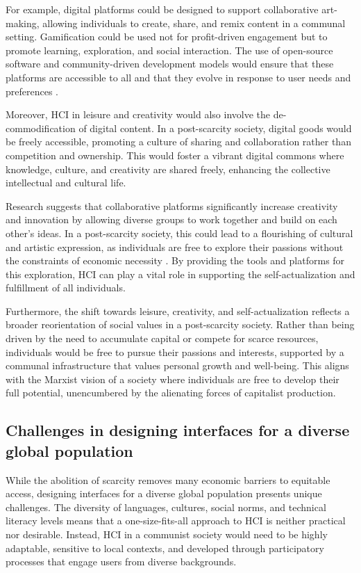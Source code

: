 For example, digital platforms could be designed to support collaborative art-making, allowing individuals to create, share, and remix content in a communal setting. Gamification could be used not for profit-driven engagement but to promote learning, exploration, and social interaction. The use of open-source software and community-driven development models would ensure that these platforms are accessible to all and that they evolve in response to user needs and preferences \cite[pp.~67-69]{debord1967}.

Moreover, HCI in leisure and creativity would also involve the de-commodification of digital content. In a post-scarcity society, digital goods would be freely accessible, promoting a culture of sharing and collaboration rather than competition and ownership. This would foster a vibrant digital commons where knowledge, culture, and creativity are shared freely, enhancing the collective intellectual and cultural life.

Research suggests that collaborative platforms significantly increase creativity and innovation by allowing diverse groups to work together and build on each other's ideas. In a post-scarcity society, this could lead to a flourishing of cultural and artistic expression, as individuals are free to explore their passions without the constraints of economic necessity \cite[pp.~158-160]{freire2005}. By providing the tools and platforms for this exploration, HCI can play a vital role in supporting the self-actualization and fulfillment of all individuals.

Furthermore, the shift towards leisure, creativity, and self-actualization reflects a broader reorientation of social values in a post-scarcity society. Rather than being driven by the need to accumulate capital or compete for scarce resources, individuals would be free to pursue their passions and interests, supported by a communal infrastructure that values personal growth and well-being. This aligns with the Marxist vision of a society where individuals are free to develop their full potential, unencumbered by the alienating forces of capitalist production.

\subsection{Challenges in designing interfaces for a diverse global population}

While the abolition of scarcity removes many economic barriers to equitable access, designing interfaces for a diverse global population presents unique challenges. The diversity of languages, cultures, social norms, and technical literacy levels means that a one-size-fits-all approach to HCI is neither practical nor desirable. Instead, HCI in a communist society would need to be highly adaptable, sensitive to local contexts, and developed through participatory processes that engage users from diverse backgrounds.

